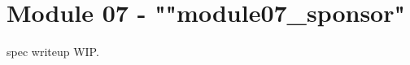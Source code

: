 \newpage
\section{Module 07 - {\ttfamily ""module07\_sponsor"}}
\label{sec:module07_predicate}

spec writeup WIP.

